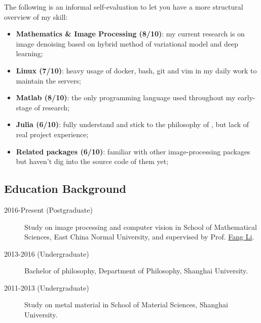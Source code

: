 The following is an informal self-evaluation to let you have a more structural overview of my skill:

\begin{itemize}
    \item \textbf{Mathematics \& Image Processing (8/10)}: my current research is on image denoising based on hybrid method of variational model and deep learning;
    \item \textbf{Linux (7/10)}: heavy usage of docker, bash, git and vim in my daily work to maintain the servers;
    \item \textbf{Matlab (8/10)}: the only programming language used throughout my early-stage of research;
    \item \textbf{Julia (6/10)}: fully understand and stick to the philosophy of \langjulia, but lack of real project experience;
    \item \textbf{Related packages (6/10)}: familiar with other image-processing packages but haven't dig into the source code of them yet;
\end{itemize}

\subsection*{Education Background}

\begin{description}
    \item[2016-Present (Postgraduate)]Study on image processing and computer vision in School of Mathematical Sciences, East China Normal University, and supervised by Prof. \href{http://math.ecnu.edu.cn/~fli/}{\textsf{Fang Li}}.
    \item[2013-2016 (Undergraduate)] Bachelor of philosophy, Department of Philosophy, Shanghai University.
    \item[2011-2013 (Undergraduate)] Study on metal material in School of Material Sciences, Shanghai University.
\end{description}
